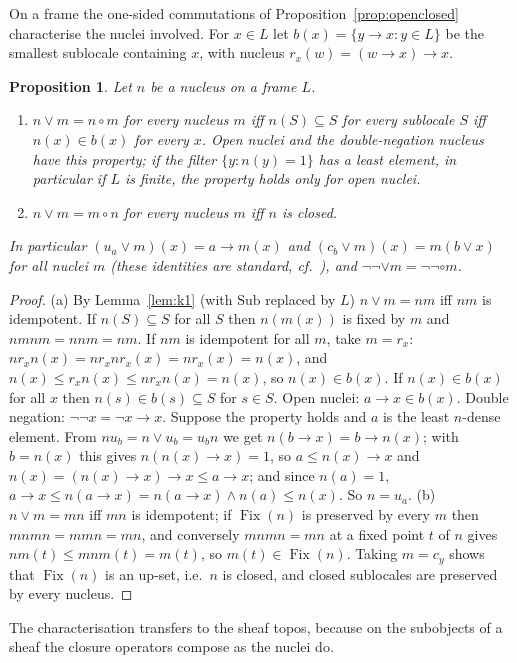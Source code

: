 \documentclass[11pt]{amsart}
\newtheorem{prop}[thm]{Proposition}
\theoremstyle{definition}
\newcommand{\Sub}{\mathrm{Sub}}
\begin{document}
On a frame the one-sided commutations of Proposition~\ref{prop:openclosed}
characterise the nuclei involved. For $x\in L$ let $b(x)=\{y\to x:y\in L\}$
be the smallest sublocale containing $x$, with nucleus $r_x(w)=(w\to x)\to x$.

\begin{prop}\label{prop:nucchar}
Let $n$ be a nucleus on a frame $L$.
\begin{enumerate}
\item[(a)] $n\vee m=n\circ m$ for every nucleus $m$ iff $n(S)\subseteq S$ for
every sublocale $S$ iff $n(x)\in b(x)$ for every $x$. Open nuclei
and the double-negation nucleus have this property; if the filter
$\{y:n(y)=1\}$ has a least element, in particular if $L$ is finite, the
property holds only for open nuclei.
\item[(b)] $n\vee m=m\circ n$ for every nucleus $m$ iff $n$ is closed.
\end{enumerate}
In particular $(u_a\vee m)(x)=a\to m(x)$ and $(c_b\vee m)(x)=m(b\vee x)$ for
all nuclei $m$ (these identities are standard, cf.\
\cite[II.2]{StoneSpaces}), and $\neg\neg\vee m=\neg\neg\circ m$.
\end{prop}
\begin{proof}
(a) By Lemma~\ref{lem:k1} (with $\Sub$ replaced by $L$) $n\vee m=nm$ iff
$nm$ is idempotent. If $n(S)\subseteq S$ for all $S$ then $n(m(x))$ is fixed
by $m$ and $nmnm=nnm=nm$. If $nm$ is idempotent for all $m$, take $m=r_x$:
$nr_xn(x)=nr_xnr_x(x)=nr_x(x)=n(x)$, and $n(x)\le r_xn(x)\le nr_xn(x)=n(x)$,
so $n(x)\in b(x)$. If $n(x)\in b(x)$ for all $x$ then $n(s)\in b(s)\subseteq
S$ for $s\in S$. Open nuclei: $a\to x\in b(x)$. Double negation:
$\neg\neg x=\neg x\to x$. Suppose the property holds and $a$ is the least
$n$-dense element. From $nu_b=n\vee u_b=u_bn$ we get $n(b\to x)=b\to n(x)$;
with $b=n(x)$ this gives $n(n(x)\to x)=1$, so $a\le n(x)\to x$ and $n(x)=
(n(x)\to x)\to x\le a\to x$; and since $n(a)=1$, $a\to x\le n(a\to x)=
n(a\to x)\wedge n(a)\le n(x)$. So $n=u_a$. (b) $n\vee m=mn$ iff $mn$ is
idempotent; if $\operatorname{Fix}(n)$ is preserved by every $m$ then
$mnmn=mmn=mn$, and conversely $mnmn=mn$ at a fixed point $t$ of $n$ gives
$nm(t)\le mnm(t)=m(t)$, so $m(t)\in\operatorname{Fix}(n)$. Taking $m=c_y$
shows that $\operatorname{Fix}(n)$ is an up-set, i.e.\ $n$ is closed, and
closed sublocales are preserved by every nucleus.
\end{proof}

The characterisation transfers to the sheaf topos, because on the
subobjects of a sheaf the closure operators compose as the nuclei do.
\end{document}
